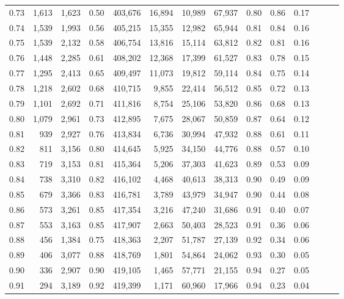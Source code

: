 \begin{tabular}{rrrrrrrrrrrrrr}
0.73 &  1,613 &  1,623 &  0.50 &  403,676 &   16,894 &  10,989 &  67,937 &  0.80 &  0.86 &      0.17 \\
0.74 &  1,539 &  1,993 &  0.56 &  405,215 &   15,355 &  12,982 &  65,944 &  0.81 &  0.84 &      0.16 \\
0.75 &  1,539 &  2,132 &  0.58 &  406,754 &   13,816 &  15,114 &  63,812 &  0.82 &  0.81 &      0.16 \\
0.76 &  1,448 &  2,285 &  0.61 &  408,202 &   12,368 &  17,399 &  61,527 &  0.83 &  0.78 &      0.15 \\
0.77 &  1,295 &  2,413 &  0.65 &  409,497 &   11,073 &  19,812 &  59,114 &  0.84 &  0.75 &      0.14 \\
0.78 &  1,218 &  2,602 &  0.68 &  410,715 &    9,855 &  22,414 &  56,512 &  0.85 &  0.72 &      0.13 \\
0.79 &  1,101 &  2,692 &  0.71 &  411,816 &    8,754 &  25,106 &  53,820 &  0.86 &  0.68 &      0.13 \\
0.80 &  1,079 &  2,961 &  0.73 &  412,895 &    7,675 &  28,067 &  50,859 &  0.87 &  0.64 &      0.12 \\
0.81 &    939 &  2,927 &  0.76 &  413,834 &    6,736 &  30,994 &  47,932 &  0.88 &  0.61 &      0.11 \\
0.82 &    811 &  3,156 &  0.80 &  414,645 &    5,925 &  34,150 &  44,776 &  0.88 &  0.57 &      0.10 \\
0.83 &    719 &  3,153 &  0.81 &  415,364 &    5,206 &  37,303 &  41,623 &  0.89 &  0.53 &      0.09 \\
0.84 &    738 &  3,310 &  0.82 &  416,102 &    4,468 &  40,613 &  38,313 &  0.90 &  0.49 &      0.09 \\
0.85 &    679 &  3,366 &  0.83 &  416,781 &    3,789 &  43,979 &  34,947 &  0.90 &  0.44 &      0.08 \\
0.86 &    573 &  3,261 &  0.85 &  417,354 &    3,216 &  47,240 &  31,686 &  0.91 &  0.40 &      0.07 \\
0.87 &    553 &  3,163 &  0.85 &  417,907 &    2,663 &  50,403 &  28,523 &  0.91 &  0.36 &      0.06 \\
0.88 &    456 &  1,384 &  0.75 &  418,363 &    2,207 &  51,787 &  27,139 &  0.92 &  0.34 &      0.06 \\
0.89 &    406 &  3,077 &  0.88 &  418,769 &    1,801 &  54,864 &  24,062 &  0.93 &  0.30 &      0.05 \\
0.90 &    336 &  2,907 &  0.90 &  419,105 &    1,465 &  57,771 &  21,155 &  0.94 &  0.27 &      0.05 \\
0.91 &    294 &  3,189 &  0.92 &  419,399 &    1,171 &  60,960 &  17,966 &  0.94 &  0.23 &      0.04 \\

\end{tabular}
